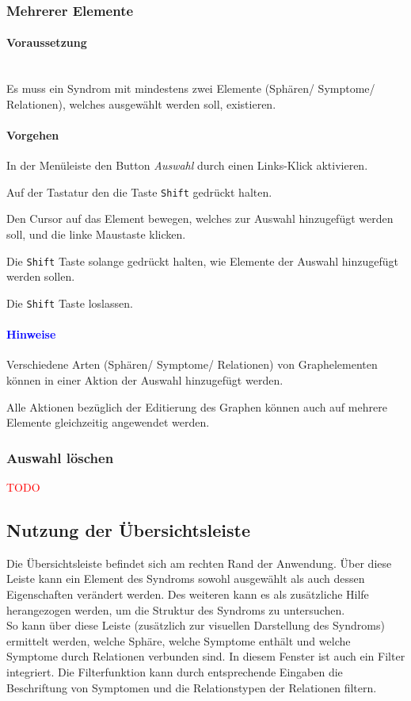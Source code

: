 \documentclass[enabledeprecatedfontcommands,fontsize=11pt,paper=a4,twoside]{scrartcl}
\newcommand*{\red}{\textcolor{red}}
\newcounter{one}
\newcounter{two}[one]
\newcommand*{\hint}{\paragraph{\textcolor{blue}{Hinweise}}}
\newcommand*{\condition}{\paragraph{Voraussetzung}$\;$ \vspace{0.2cm}\\}
\newcommand*{\action}{\paragraph{Vorgehen}}
\let\tempone\itemize
\let\temptwo\enditemize
\renewenvironment{itemize}{\tempone\addtolength{\itemsep}{-10.0pt}}{\temptwo}
\let\origenumerate\enumerate
\let\origendenumerate\endenumerate
\renewenvironment{enumerate}{\origenumerate \addtolength{\itemsep}{-10.0pt}}{\origendenumerate}
\begin{document}
	\newpage
	\subsubsection{Mehrerer Elemente}
	\condition
	Es muss ein Syndrom mit mindestens zwei Elemente (Sphären/ Symptome/ Relationen), welches ausgewählt werden soll, existieren. 
	\action
	\begin{enumerate}
		\item In der Menüleiste den Button \textit{Auswahl} durch einen Links-Klick aktivieren. 
		\item Auf der Tastatur den die Taste \texttt{Shift} gedrückt halten. 
		\item Den Cursor auf das Element bewegen, welches zur Auswahl hinzugefügt werden soll, und die linke Maustaste klicken. 
		\item Die \texttt{Shift} Taste solange gedrückt halten, wie Elemente der Auswahl hinzugefügt werden sollen.
		\item Die \texttt{Shift} Taste loslassen.
	\end{enumerate}
	\hint
	\begin{itemize}
		\item Verschiedene Arten (Sphären/ Symptome/ Relationen) von Graphelementen können in einer Aktion der Auswahl hinzugefügt werden. 
		\item Alle Aktionen bezüglich der Editierung des Graphen können auch auf mehrere Elemente gleichzeitig angewendet werden. \\
	\end{itemize}

	\subsubsection{Auswahl löschen}
	\red{TODO}
	
		\newpage
		\subsection{Nutzung der Übersichtsleiste} \label{overwiew}
		Die Übersichtsleiste befindet sich am rechten Rand der Anwendung. Über diese Leiste kann ein Element des Syndroms sowohl ausgewählt als auch dessen Eigenschaften verändert werden. Des weiteren kann es als zusätzliche Hilfe herangezogen werden, um die Struktur des Syndroms zu untersuchen. \\
		So kann über diese Leiste (zusätzlich zur visuellen Darstellung des Syndroms) ermittelt werden, welche Sphäre, welche Symptome enthält und welche Symptome durch Relationen verbunden sind. In diesem Fenster ist auch ein Filter integriert. Die Filterfunktion kann durch entsprechende Eingaben die Beschriftung von Symptomen und die Relationstypen der Relationen filtern.
		
\end{document}
